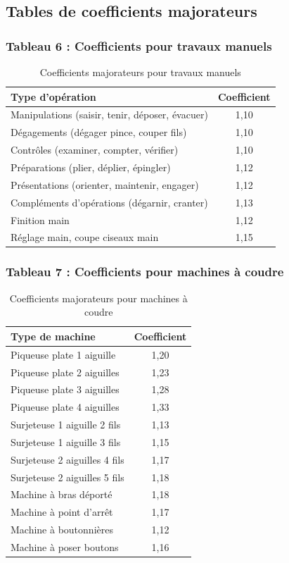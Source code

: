 \documentclass[a4paper,12pt]{article}
\begin{document}
\subsection{Tables de coefficients majorateurs}

\subsubsection{Tableau 6 : Coefficients pour travaux manuels}

\begin{table}[ht]
\centering
\begin{tabular}{|l|c|}
\hline
\textbf{Type d'opération} & \textbf{Coefficient} \\
\hline
Manipulations (saisir, tenir, déposer, évacuer) & 1,10 \\
Dégagements (dégager pince, couper fils) & 1,10 \\
Contrôles (examiner, compter, vérifier) & 1,10 \\
Préparations (plier, déplier, épingler) & 1,12 \\
Présentations (orienter, maintenir, engager) & 1,12 \\
Compléments d'opérations (dégarnir, cranter) & 1,13 \\
Finition main & 1,12 \\
Réglage main, coupe ciseaux main & 1,15 \\
\hline
\end{tabular}
\caption{Coefficients majorateurs pour travaux manuels}
\end{table}

\subsubsection{Tableau 7 : Coefficients pour machines à coudre}

\begin{table}[ht]
\centering
\begin{tabular}{|l|c|}
\hline
\textbf{Type de machine} & \textbf{Coefficient} \\
\hline
Piqueuse plate 1 aiguille & 1,20 \\
Piqueuse plate 2 aiguilles & 1,23 \\
Piqueuse plate 3 aiguilles & 1,28 \\
Piqueuse plate 4 aiguilles & 1,33 \\
Surjeteuse 1 aiguille 2 fils & 1,13 \\
Surjeteuse 1 aiguille 3 fils & 1,15 \\
Surjeteuse 2 aiguilles 4 fils & 1,17 \\
Surjeteuse 2 aiguilles 5 fils & 1,18 \\
Machine à bras déporté & 1,18 \\
Machine à point d'arrêt & 1,17 \\
Machine à boutonnières & 1,12 \\
Machine à poser boutons & 1,16 \\
\hline
\end{tabular}
\caption{Coefficients majorateurs pour machines à coudre}
\end{table}
\end{document}
